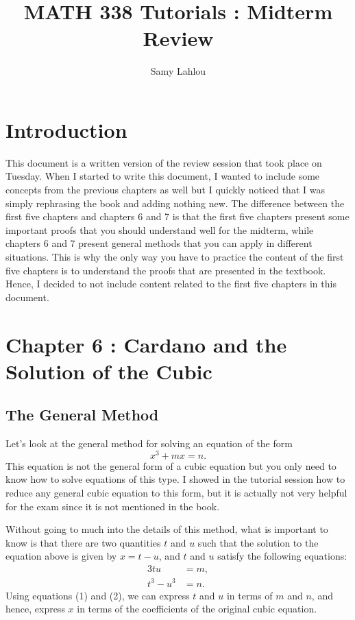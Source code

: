 \documentclass{article}
\title{MATH 338 Tutorials : Midterm Review}
\author{Samy Lahlou}
\date{}
\theoremstyle{plain}
\theoremstyle{definition}
\begin{document}
\maketitle

\section*{Introduction}

This document is a written version of the review session that took place on Tuesday. When I started to write this document, I wanted to include some concepts from the previous chapters as well but I quickly noticed that I was simply rephrasing the book and adding nothing new. The difference between the first five chapters and chapters 6 and 7 is that the first five chapters present some important proofs that you should understand well for the midterm, while chapters 6 and 7 present general methods that you can apply in different situations. This is why the only way you have to practice the content of the first five chapters is to understand the proofs that are presented in the textbook. Hence, I decided to not include content related to the first five chapters in this document.

\section*{Chapter 6 : Cardano and the Solution of the Cubic}

\subsection*{The General Method}

Let's look at the general method for solving an equation of the form
$$x^3 + mx = n.$$
This equation is not the general form of a cubic equation but you only need to know how to solve equations of this type. I showed in the tutorial session how to reduce any general cubic equation to this form, but it is actually not very helpful for the exam since it is not mentioned in the book.

Without going to much into the details of this method, what is important to know is that there are two quantities $t$ and $u$ such that the solution to the equation above is given by $x = t - u$, and $t$ and $u$ satisfy the following equations:
\begin{align}
    3tu &= m, \\
    t^3 - u^3 &= n.
\end{align}
Using equations (1) and (2), we can express $t$ and $u$ in terms of $m$ and $n$, and hence, express $x$ in terms of the coefficients of the original cubic equation.
\end{document}
